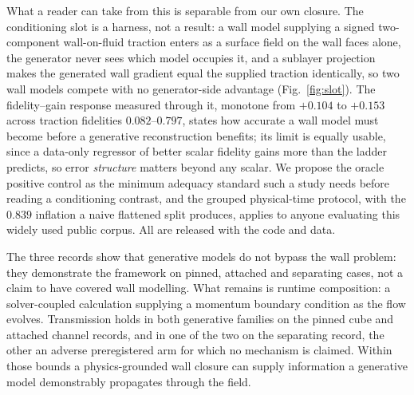 What a reader can take from this is separable from our own closure. The conditioning slot is a
harness, not a result: a wall model supplying a signed two-component wall-on-fluid traction enters as a
surface field on the wall faces alone, the generator never sees which model occupies it, and a
sublayer projection makes the generated wall gradient equal the supplied traction identically, so
two wall models compete with no generator-side advantage (Fig.~\ref{fig:slot}). The
fidelity--gain response measured through it, monotone from $+0.104$ to $+0.153$ across traction
fidelities $0.082$--$0.797$, states how accurate a wall model must become before a generative
reconstruction benefits; its limit is equally usable, since a data-only regressor of better
scalar fidelity gains more than the ladder predicts, so error \emph{structure} matters beyond any
scalar. We propose the oracle positive control as the minimum adequacy standard such a study needs
before reading a conditioning contrast, and the grouped physical-time protocol, with the $0.839$ inflation a naive
flattened split produces, applies to anyone evaluating this widely used public corpus. All are
released with the code and data.

The three records show that generative models do not bypass the wall problem: they demonstrate
the framework on pinned, attached and separating cases, not a claim to have covered wall
modelling. What remains is runtime composition: a solver-coupled calculation supplying a momentum
boundary condition as the flow evolves. Transmission holds in both generative families on the
pinned cube and attached channel records, and in one of the two on the separating record,
the other an adverse preregistered arm for which no mechanism is claimed. Within those bounds a
physics-grounded wall closure can supply information a generative model demonstrably propagates
through the field.
